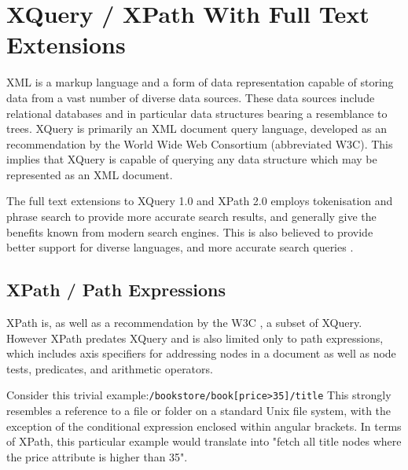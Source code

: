 \section{XQuery / XPath With Full Text Extensions}
\label{sect:theory:xquery}
XML is a markup language and a form of data representation capable of storing
data from a vast number of diverse data sources. These data sources include
relational databases and in particular data structures bearing a resemblance to
trees. XQuery is primarily an XML document query language, developed as an
recommendation by the World Wide Web Consortium\cite{w3c00} (abbreviated W3C).
This implies that XQuery is capable of querying any data structure which may be
represented as an XML document.

The full text extensions to XQuery 1.0 and XPath 2.0 employs tokenisation and
phrase search to provide more accurate search results, and generally give the
benefits known from modern search engines. This is also believed to provide
better support for diverse languages, and more accurate search queries \cite{w3c02}.

\subsection{XPath / Path Expressions}
XPath is, as well as a recommendation by the W3C \cite{w3c01}, a subset of
XQuery. However XPath predates XQuery and is also limited only to path
expressions, which includes axis specifiers for addressing nodes in a document
as well as node tests, predicates, and arithmetic operators.

Consider this trivial example\cite{w3s00}:\verb!/bookstore/book[price>35]/title! 
This strongly resembles a reference to a file or folder on a standard Unix file
system, with the exception of the conditional expression enclosed within
angular brackets. In terms of XPath, this particular example would translate
into "fetch all title nodes where the price attribute is higher than 35".

